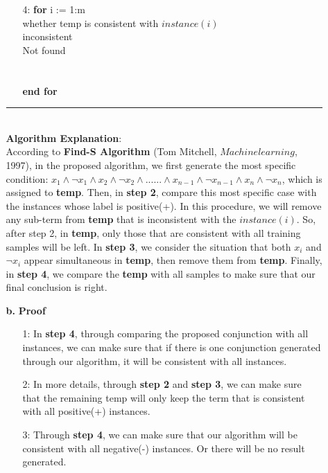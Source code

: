 \begin{enumerate}
\begin{enumerate}
\begin{enumerate}
\item[4:] {\bf for} i := 1:m\\
\indent {} whether temp is consistent with $instance(i)$\\
\indent {} inconsistent\\
\indent \qquad {} Not found\\
\indent \qquad {}\\
\indent {}\\
{\bf end for}
\end{enumerate}
\rule{400pt}{2pt}\\

{\bf Algorithm Explanation}:\\

According to {\bf Find-S Algorithm} (Tom Mitchell, $Machine learning$, 1997), in the proposed algorithm, we first generate the most specific condition: $x_1 \wedge \neg x_1 \wedge x_2 \wedge \neg x_2 \wedge......\wedge x_{n-1} \wedge \neg x_{n-1} \wedge x_n \wedge \neg x_n$, which is assigned to {\bf temp}. Then, in {\bf step 2}, compare this most specific case with the instances whose label is positive(+). In this procedure, we will remove any sub-term from {\bf temp} that is inconsistent with the $instance(i)$. So, after step 2, in {\bf temp}, only those that are consistent with all training samples will be left. In {\bf step 3}, we consider the situation that both $x_i$ and $\neg x_i$ appear simultaneous in {\bf temp}, then remove them from {\bf temp}. Finally, in {\bf step 4}, we compare the {\bf temp} with all samples to make sure that our final conclusion is right.\\

\item[\bf{b.}] {\bf Proof}\\
\begin{enumerate}
\item[1: ] In {\bf step 4}, through comparing the proposed conjunction with all instances, we can make sure that if there is one conjunction generated through our algorithm, it will be consistent with all instances.
\item[2: ] In more details, through {\bf step 2} and {\bf step 3}, we can make sure that the remaining temp will only keep the term that is consistent with all positive(+) instances.
\item[3: ] Through {\bf step 4}, we can make sure that our algorithm will be consistent with all negative(-) instances. Or there will be no result generated.\\


\end{enumerate}
\end{enumerate}
\end{enumerate}

